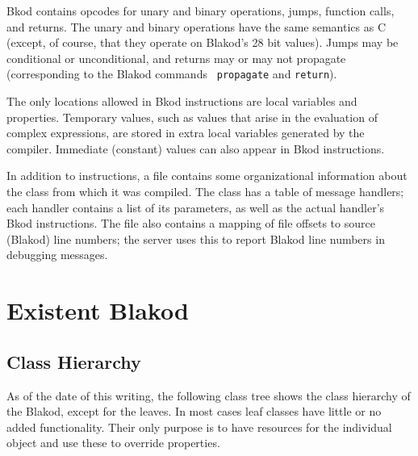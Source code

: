 Bkod contains opcodes for unary and binary operations, jumps, function
calls, and returns.  The unary and binary operations have the same
semantics as C (except, of course, that they operate on Blakod's 28
bit values).  Jumps may be conditional or unconditional, and returns
may or may not propagate (corresponding to the Blakod commands {\tt
propagate} and {\tt return}).

The only locations allowed in Bkod instructions are local variables
and properties.  Temporary values, such as values that arise in the
evaluation of complex expressions, are stored in extra local variables
generated by the compiler.  Immediate (constant) values can also
appear in Bkod instructions.

In addition to instructions, a \bof file contains some organizational
information about the class from which it was compiled.  The class has
a table of message handlers; each handler contains a list of its
parameters, as well as the actual handler's Bkod instructions.  The
file also contains a mapping of \bof file offsets to source (Blakod)
line numbers; the server uses this to report Blakod line numbers in
debugging messages.

\section{Existent Blakod}

\subsection{Class Hierarchy}
As of the date of this writing, the following class tree shows the
class hierarchy of the Blakod, except for the leaves.  In most
cases leaf classes have little or no added functionality.  Their only
purpose is to have resources for the individual object and use these
to override properties.

